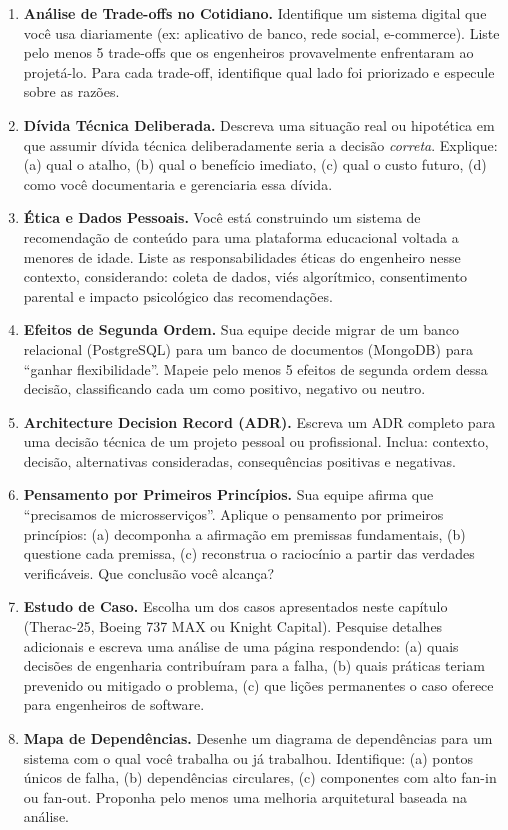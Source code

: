 \begin{enumerate}
    \item \textbf{Análise de Trade-offs no Cotidiano.} Identifique um sistema digital que você usa diariamente (ex: aplicativo de banco, rede social, e-commerce). Liste pelo menos 5 trade-offs que os engenheiros provavelmente enfrentaram ao projetá-lo. Para cada trade-off, identifique qual lado foi priorizado e especule sobre as razões.

    \item \textbf{Dívida Técnica Deliberada.} Descreva uma situação real ou hipotética em que assumir dívida técnica deliberadamente seria a decisão \emph{correta}. Explique: (a) qual o atalho, (b) qual o benefício imediato, (c) qual o custo futuro, (d) como você documentaria e gerenciaria essa dívida.

    \item \textbf{Ética e Dados Pessoais.} Você está construindo um sistema de recomendação de conteúdo para uma plataforma educacional voltada a menores de idade. Liste as responsabilidades éticas do engenheiro nesse contexto, considerando: coleta de dados, viés algorítmico, consentimento parental e impacto psicológico das recomendações.

    \item \textbf{Efeitos de Segunda Ordem.} Sua equipe decide migrar de um banco relacional (PostgreSQL) para um banco de documentos (MongoDB) para ``ganhar flexibilidade''. Mapeie pelo menos 5 efeitos de segunda ordem dessa decisão, classificando cada um como positivo, negativo ou neutro.

    \item \textbf{Architecture Decision Record (ADR).} Escreva um ADR completo para uma decisão técnica de um projeto pessoal ou profissional. Inclua: contexto, decisão, alternativas consideradas, consequências positivas e negativas.

    \item \textbf{Pensamento por Primeiros Princípios.} Sua equipe afirma que ``precisamos de microsserviços''. Aplique o pensamento por primeiros princípios: (a) decomponha a afirmação em premissas fundamentais, (b) questione cada premissa, (c) reconstrua o raciocínio a partir das verdades verificáveis. Que conclusão você alcança?

    \item \textbf{Estudo de Caso.} Escolha um dos casos apresentados neste capítulo (Therac-25, Boeing 737 MAX ou Knight Capital). Pesquise detalhes adicionais e escreva uma análise de uma página respondendo: (a) quais decisões de engenharia contribuíram para a falha, (b) quais práticas teriam prevenido ou mitigado o problema, (c) que lições permanentes o caso oferece para engenheiros de software.

    \item \textbf{Mapa de Dependências.} Desenhe um diagrama de dependências para um sistema com o qual você trabalha ou já trabalhou. Identifique: (a) pontos únicos de falha, (b) dependências circulares, (c) componentes com alto fan-in ou fan-out. Proponha pelo menos uma melhoria arquitetural baseada na análise.
\end{enumerate}
